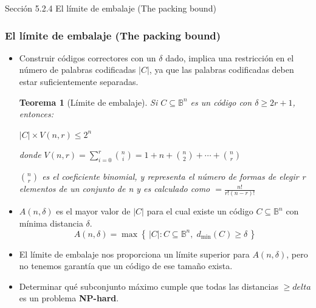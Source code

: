 \documentclass{beamer}
\theoremstyle{plain}
\newtheorem{teorema} [Teorema] {Teorema}
\theoremstyle{example}
\theoremstyle{example}
\begin{document}
\begin{frame}   \footnotesize
{
\begin{block}{Sección 5.2.4}
El límite de embalaje (The packing bound)
\end{block}
}
\end{frame} 
\begin{frame}  \frametitle{El límite de embalaje (The packing bound)}\footnotesize  
\begin{itemize} 




\item  Construir códigos correctores con un $\delta$ dado, implica una restricción en  el número de palabras codificadas $|C|$, ya que las palabras codificadas deben estar suficientemente separadas. 

\begin{teorema}[Límite de embalaje]

Si $C \subseteq \mathbb{B}^n$ es un código con $\delta \geq 2r+1$, entonces:

\begin{center}
    $ |C| \times V(n,r)    	\leq 2^n  $		
\end{center}

donde $V(n,r) = \sum_{i=0}^{r} \binom{n}{i} = 1 + n + \binom{n}{2} + \cdots + \binom{n}{r}$

\vspace{0.4cm}

\tiny
 $\binom{n}{r}$  es el coeficiente binomial, y representa el número de formas de elegir r elementos de un conjunto de n y es calculado como $=\frac{n!}{r! (n-r)!}$

\end{teorema}


\item  $A(n,\delta)$ es el mayor valor de $|C|$ para el cual existe un código $C \subseteq \mathbb{B}^n$ con mínima distancia $\delta$.  
\[
A(n, \delta) = \max \left\{\, |C| : C \subseteq \mathbb{B}^n,\; d_{\min}(C) \ge \delta \,\right\}
\]
\item El límite de embalaje nos proporciona un límite superior para $A(n,\delta)$, pero no tenemos garantía que un código de ese tamaño exista. 

\item Determinar qué subconjunto máximo cumple que todas las distancias $ \geq delta$  es un problema \textbf{NP-hard}.

\end{itemize} 

\end{frame} 
\end{document}
